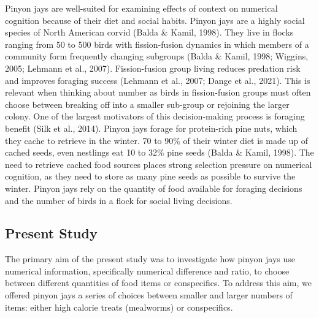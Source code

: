\documentclass[
  english,
  ,doc,floatsintext]{apa6}
\begin{document}
Pinyon jays are well-suited for examining effects of context on numerical cognition because of their diet and social habits. Pinyon jays are a highly social species of North American corvid (Balda \& Kamil, 1998). They live in flocks ranging from 50 to 500 birds with fission-fusion dynamics in which members of a community form frequently changing subgroups (Balda \& Kamil, 1998; Wiggins, 2005; Lehmann et al., 2007). Fission-fusion group living reduces predation risk and improves foraging success (Lehmann et al., 2007; Dange et al., 2021). This is relevant when thinking about number as birds in fission-fusion groups must often choose between breaking off into a smaller sub-group or rejoining the larger colony. One of the largest motivators of this decision-making process is foraging benefit (Silk et al., 2014). Pinyon jays forage for protein-rich pine nuts, which they cache to retrieve in the winter. 70 to 90\% of their winter diet is made up of cached seeds, even nestlings eat 10 to 32\% pine seeds (Balda \& Kamil, 1998). The need to retrieve cached food sources places strong selection pressure on numerical cognition, as they need to store as many pine seeds as possible to survive the winter. Pinyon jays rely on the quantity of food available for foraging decisions and the number of birds in a flock for social living decisions.

\hypertarget{present-study}{%
\subsection{Present Study}\label{present-study}}

The primary aim of the present study was to investigate how pinyon jays use numerical information, specifically numerical difference and ratio, to choose between different quantities of food items or conspecifics. To address this aim, we offered pinyon jays a series of choices between smaller and larger numbers of items: either high calorie treats (mealworms) or conspecifics.
\end{document}
